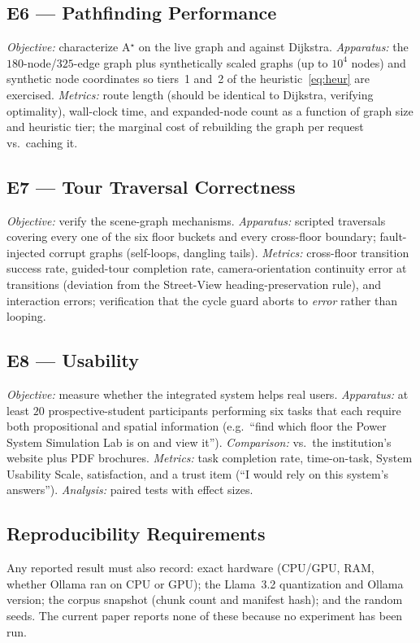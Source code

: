 \subsection{E6 --- Pathfinding Performance}
\emph{Objective:} characterize A$^{\star}$ on the live graph and against
Dijkstra. \emph{Apparatus:} the $180$-node/$325$-edge graph plus
synthetically scaled graphs (up to $10^4$ nodes) and synthetic node
coordinates so tiers~1 and~2 of the heuristic~\eqref{eq:heur} are
exercised. \emph{Metrics:} route length (should be identical to Dijkstra,
verifying optimality), wall-clock time, and expanded-node count as a
function of graph size and heuristic tier; the marginal cost of rebuilding
the graph per request vs.\ caching it.

\subsection{E7 --- Tour Traversal Correctness}
\emph{Objective:} verify the scene-graph mechanisms. \emph{Apparatus:}
scripted traversals covering every one of the six floor buckets and every
cross-floor boundary; fault-injected corrupt graphs (self-loops, dangling
tails). \emph{Metrics:} cross-floor transition success rate, guided-tour
completion rate, camera-orientation continuity error at transitions
(deviation from the Street-View heading-preservation rule), and interaction
errors; verification that the cycle guard aborts to \emph{error} rather
than looping.

\subsection{E8 --- Usability}
\emph{Objective:} measure whether the integrated system helps real users.
\emph{Apparatus:} at least $20$ prospective-student participants performing
six tasks that each require both propositional and spatial information
(e.g.\ ``find which floor the Power System Simulation Lab is on and view
it''). \emph{Comparison:} \system{} vs.\ the institution's website plus PDF
brochures. \emph{Metrics:} task completion rate, time-on-task, System
Usability Scale, satisfaction, and a trust item (``I would rely on this
system's answers''). \emph{Analysis:} paired tests with effect sizes.

\subsection{Reproducibility Requirements}
Any reported result must also record: exact hardware (CPU/GPU, RAM, whether
Ollama ran on CPU or GPU); the Llama~3.2 quantization and Ollama version;
the corpus snapshot (chunk count and manifest hash); and the random seeds.
The current paper reports none of these because no experiment has been run.
